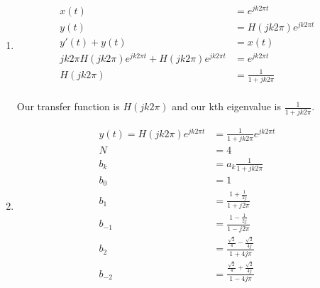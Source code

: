 \documentclass[10pt,a4paper, margin=1in]{article}
\begin{document}
\begin{enumerate}
\begin{enumerate}
\begin{center}
         \\
    \end{center} 

    \item %
    \begin{align*}
        x(t) & = e^{jk2\pi t} \\
        y(t) & = H(jk2\pi )e^{jk2\pi t} \\
        y'(t) + y(t) & = x(t) \\
        jk2\pi H(jk2\pi )e^{jk2\pi t} + H(jk2\pi )e^{jk2\pi t} & = e^{jk2\pi t} \\
        H(jk2\pi ) & = \frac{1}{1 + jk2\pi } \\
    \end{align*}

    Our transfer function is $H(jk2\pi )$ and our kth eigenvalue is $\frac{1}{1 + jk2\pi }$.\\

	\item %
    \begin{align*}
        y(t) = H(jk2\pi )e^{jk2\pi t} & = \frac{1}{1 + jk2\pi }e^{jk2\pi t} \\
        N & = 4 \\ 
        b_k & = a_k\frac{1}{1 + jk2\pi } \\ 
        b_0 & = 1 \\
        b_1 & = \frac{1 + \frac{1}{2j}}{1 + j2\pi } \\
        b_{-1} & = \frac{1 - \frac{1}{2j}}{1 - j2\pi } \\
        b_2 & = \frac{\frac{\sqrt{2}}{4} - \frac{\sqrt{2}}{4j}}{1 + 4j\pi } \\
        b_{-2} & = \frac{\frac{\sqrt{2}}{4} + \frac{\sqrt{2}}{4j}}{1 - 4j\pi } \\
    \end{align*}


\end{enumerate}
\end{enumerate}
\end{document}
